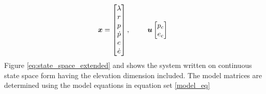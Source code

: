 \documentclass[a4paper, 12pt]{article}\usepackage[utf8]{inputenc}
\begin{document}
\begin{equation}\label{eq:part4_x_u}
    \boldsymbol{x}=\begin{bmatrix}
    \lambda\\
    r\\
    p\\
    \dot{p}\\
    e\\
    \dot{e}\\
    \end{bmatrix}, 
    \begin{tabular}{cc}
         &  \\
         & 
    \end{tabular}
    \boldsymbol{u}\begin{bmatrix}
    p_c\\
    e_c\\
    \end{bmatrix}
\end{equation}
Figure \ref{eq:state_space_extended} and shows the system written on continuous state space form having the elevation dimension included. The model matrices are determined using the model equations in equation set \ref{model_eq}
\end{document}
